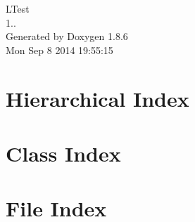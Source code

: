 \documentclass[twoside]{book}
\newcommand{\clearemptydoublepage}{%
  \newpage{\pagestyle{empty}\cleardoublepage}%
}
\begin{document}
\hypersetup{pageanchor=false}
\begin{titlepage}
\vspace*{7cm}
\begin{center}%
{\Large L\-Test \\[1ex]\large 1.. }\\
\vspace*{1cm}
{\large Generated by Doxygen 1.8.6}\\
\vspace*{0.5cm}
{\small Mon Sep 8 2014 19:55:15}\\
\end{center}
\end{titlepage}
\clearemptydoublepage
\tableofcontents
\clearemptydoublepage
{}
\hypersetup{pageanchor=true}

\chapter{Hierarchical Index}

\chapter{Class Index}

\chapter{File Index}

\end{document}
